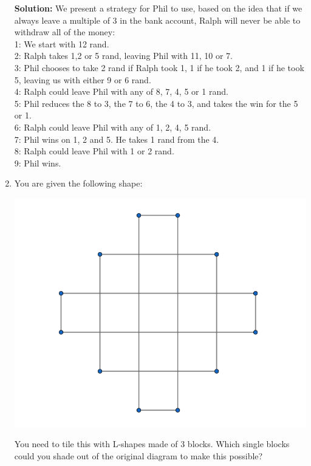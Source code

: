 \documentclass{article}
\begin{document}
\begin{enumerate}[1.]
\textbf{Solution:}
We present a strategy for Phil to use, based on the idea that if we always leave a multiple of 3 in the bank account, Ralph will never be able to withdraw all of the money:\\
1: We start with 12 rand.\\
2: Ralph takes 1,2 or 5 rand, leaving Phil with 11, 10 or 7.\\
3: Phil chooses to take 2 rand if Ralph took 1, 1 if he took 2, and 1 if he took 5, leaving us with either 9 or 6 rand.\\
4: Ralph could leave Phil with any of 8, 7, 4, 5 or 1 rand.\\
5: Phil reduces the 8 to 3, the 7 to 6, the 4 to 3, and takes the win for the 5 or 1.\\
6: Ralph could leave Phil with any of 1, 2, 4, 5 rand.\\
7: Phil wins on 1, 2 and 5. He takes 1 rand from the 4.\\
8: Ralph could leave Phil with 1 or 2 rand.\\
9: Phil wins.\\



\item You are given the following shape: %
\begin{center}
	\includegraphics[scale=0.3]{Capture.png}	
\end{center}
	You need to tile this with L-shapes made of 3 blocks. Which single blocks could you shade out of the original diagram to make this possible?\\
	

\end{enumerate}
\end{document}
